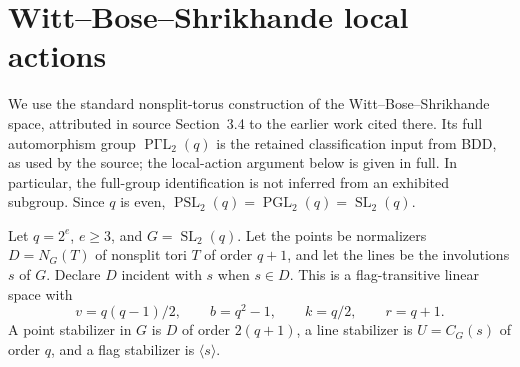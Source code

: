 \section{Witt--Bose--Shrikhande local actions}
We use the standard nonsplit-torus construction of the
Witt--Bose--Shrikhande space, attributed in source Section~3.4 to the earlier
work cited there. Its full automorphism group
$\operatorname{P\Gamma L}_2(q)$ is the retained classification input from
BDD, as used by the source; the local-action argument below is given in
full. In particular, the full-group identification is not inferred from
an exhibited subgroup. Since $q$ is even,
$\operatorname{PSL}_2(q)=\operatorname{PGL}_2(q)=\operatorname{SL}_2(q)$.

\begin{proposition}\label{wbs-model}
Let $q=2^e$, $e\geq3$, and $G=\operatorname{SL}_2(q)$. Let the points be
normalizers $D=N_G(T)$ of nonsplit tori $T$ of order $q+1$, and let the lines
be the involutions $s$ of $G$. Declare $D$ incident with $s$ when $s\in D$.
This is a flag-transitive linear space with
\[
 v=q(q-1)/2,\qquad b=q^2-1,\qquad k=q/2,\qquad r=q+1.
\]
A point stabilizer in $G$ is $D$ of order $2(q+1)$, a line stabilizer is
$U=C_G(s)$ of order $q$, and a flag stabilizer is $\langle s\rangle$.
\end{proposition}
